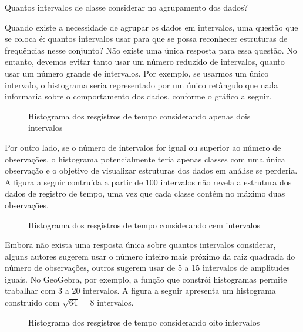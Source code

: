 \begin{example}{Quantos intervalos de classe considerar no agrupamento dos dados?}

Quando existe a necessidade de agrupar os dados em intervalos, uma questão que se coloca é: quantos intervalos usar para que se possa reconhecer estruturas de frequências nesse conjunto? Não existe uma única resposta para essa questão. No entanto, devemos evitar tanto usar um número reduzido de intervalos, quanto usar um número grande de intervalos. Por exemplo, se usarmos um único intervalo, o histograma seria representado por um único retângulo que nada informaria sobre o comportamento dos dados, conforme o gráfico a seguir.

\begin{figure}[H]
\centering
\capstart

\noindent{}
\caption{Histograma dos resgistros de tempo considerando apenas dois intervalos}\label{\detokenize{PE103-4:id4}}\end{figure}

Por outro lado, se o número de intervalos for igual ou superior ao número de observações, o histograma potencialmente teria apenas classes com uma única observação e o objetivo de visualizar estruturas dos dados em análise se perderia. A figura a seguir contruída a partir de 100 intervalos não revela a estrutura dos dados de registro de tempo, uma vez que cada classe contém no máximo duas observações.

\begin{figure}[H]
\centering
\capstart

\noindent{}
\caption{Histograma dos resgistros de tempo considerando cem intervalos}\label{\detokenize{PE103-4:id5}}\end{figure}

Embora não exista uma resposta única sobre quantos intervalos considerar, alguns autores sugerem usar o número inteiro mais próximo da raiz quadrada do número de observações, outros sugerem usar de 5 a 15 intervalos de amplitudes iguais. No GeoGebra, por exemplo, a função que constrói histogramas permite trabalhar com 3 a 20 intervalos. A figura a seguir apresenta um histograma construído com \(\sqrt{64}=8\) intervalos.

\begin{figure}[H]
\centering
\capstart

\noindent{}
\caption{Histograma dos resgistros de tempo considerando oito intervalos}\label{\detokenize{PE103-4:id6}}\end{figure}
\end{example}


